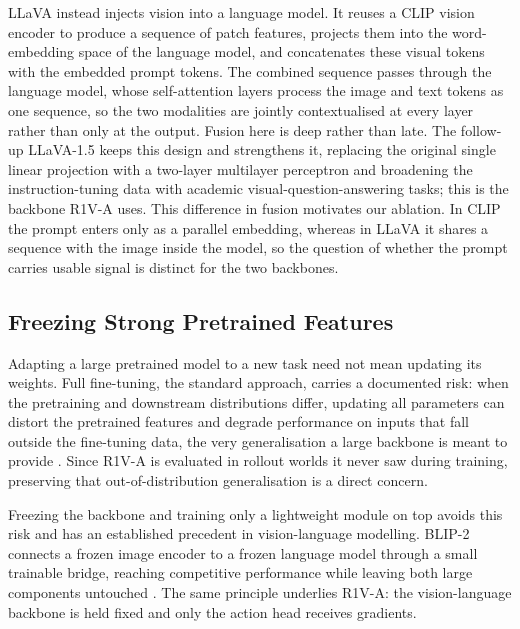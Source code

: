 LLaVA \cite{liu2023llava} instead injects vision into a language model. It
reuses a CLIP vision encoder to produce a sequence of patch features,
projects them into the word-embedding space of the language model, and
concatenates these visual tokens with the embedded prompt tokens. The
combined sequence passes through the language model, whose self-attention
layers process the image and text tokens as one sequence, so the two
modalities are jointly contextualised at every layer rather than only at the
output. Fusion here is deep rather than late. The follow-up LLaVA-1.5
\cite{liu2024improvedbaselinesvisualinstruction} keeps this design and
strengthens it, replacing the original single linear projection with a
two-layer multilayer perceptron and broadening the instruction-tuning data
with academic visual-question-answering tasks; this is the backbone R1V-A
uses. This difference in fusion motivates our ablation. In CLIP the prompt
enters only as a parallel embedding, whereas in LLaVA it shares a sequence
with the image inside the model, so the question of whether the prompt
carries usable signal is distinct for the two backbones.

\subsection{Freezing Strong Pretrained Features}
\label{subsec:bg-freeze}
Adapting a large pretrained model to a new task need not mean updating its
weights. Full fine-tuning, the standard approach, carries a documented risk:
when the pretraining and downstream distributions differ, updating all
parameters can distort the pretrained features and degrade performance on
inputs that fall outside the fine-tuning data, the very generalisation a
large backbone is meant to provide
\cite{kumar2022finetuningdistortpretrainedfeatures}. Since R1V-A is evaluated
in rollout worlds it never saw during training, preserving that
out-of-distribution generalisation is a direct concern.

Freezing the backbone and training only a lightweight module on top avoids
this risk and has an established precedent in vision-language modelling.
BLIP-2 connects a frozen image encoder to a frozen language model through a
small trainable bridge, reaching competitive performance while leaving both
large components untouched
\cite{li2023blip2bootstrappinglanguageimagepretraining}. The same principle
underlies R1V-A: the vision-language backbone is held fixed and only the
action head receives gradients.

